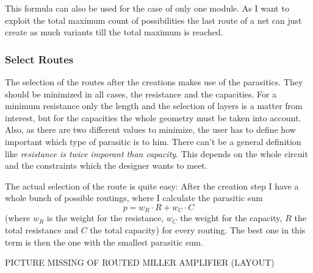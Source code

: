 This formula can also be used for the case of only one module. As I want to exploit the total maximum count of possibilities the last route of a net can just create as much variants till the total maximum is reached.

\subsubsection{Select Routes}
The selection of the routes after the creations makes use of the parasitics. They should be minimized in all cases, the resistance and the capacities. For a minimum resistance only the length and the selection of layers is a matter from interest, but for the capacities the whole geometry must be taken into account. Also, as there are two different values to minimize, the user has to define how important which type of parasitic is to him. There can't be a general definition like \emph{resistance is twice imporant than capacity}. This depends on the whole circuit and the constraints which the designer wants to meet.

The actual selection of the route is quite easy: After the creation step I have a whole bunch of possible routings, where I calculate the parasitic sum
\[p = w_R \cdot R + w_C \cdot C\]
(where $w_R$ is the weight for the resistance, $w_C$ the weight for the capacity, $R$ the total resistance and $C$ the total capacity) for every routing. The best one in this term is then the one with the smallest parasitic sum.

PICTURE MISSING OF ROUTED MILLER AMPLIFIER (LAYOUT)
